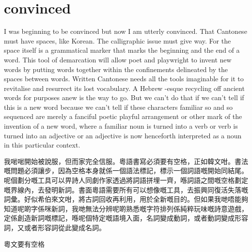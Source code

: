 \section{convinced}
I was beginning to be convinced but now I am utterly convinced. That Cantonese must have spaces, like Korean. The calligraphic issue must give way. For the space itself is a grammatical marker that marks the beginning and the end of a word. This tool of demarcation will allow poet and playwright to invent new words by putting words together within the confinements delineated by the spaces between words. Written Cantonese needs all the tools imaginable for it to revitalise and resurrect its lost vocabulary. A Hebrew -esque recycling off ancient words for purposes anew is the way to go. But we can’t do that if we can’t tell if this is a new word because we can’t tell if these  characters familiar so and so sequenced are merely a fanciful poetic playful arrangement or other mark of the invention of a new word, where a familiar noun is turned into a verb or verb is turned into an adjective or an adjective is now henceforth interpreted as a noun in this particular context.

我啱啱開始被說服，但而家完全信服。粵語書寫必須要有空格，正如韓文咁。書法嘅問題必須讓步，因為空格本身就係一個語法標記，標示一個詞語嘅開始同結尾。呢個劃分嘅工具可以畀詩人同劇作家透過將詞語拼埋一齊，喺詞語之間嘅空格劃定嘅界線內，去發明新詞。書面粵語需要所有可以想像嘅工具，去振興同復活失落嘅詞彙。好似希伯來文咁，將古詞回收再利用，用於全新嘅目的。但如果我哋唔能夠知道呢啲字係咪新詞，我哋無法分辨呢啲熟悉嘅字符排列係純粹玩味嘅詩意遊戲，定係創造新詞嘅標記，喺呢個特定嘅語境入面，名詞變成動詞，或者動詞變成形容詞，又或者形容詞從此變成名詞。






粵文要有空格

